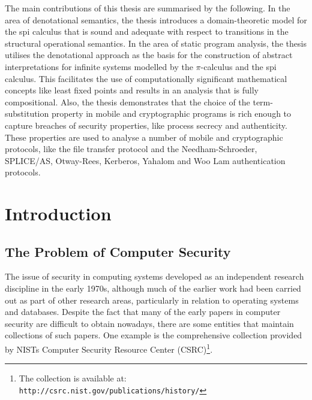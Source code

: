 \documentclass[10pt,a4paper,final,oneside,fleqn]{book}
\begin{document}
The main contributions of this thesis are summarised by the following. In the area of denotational semantics, the thesis introduces a domain-theoretic model for the spi calculus that is sound and adequate with respect to transitions in the structural operational semantics.  In the area of static program analysis, the thesis utilises the denotational approach as the basis for the construction of abstract interpretations for infinite systems modelled by the $\pi$-calculus and the spi calculus. This facilitates the use of computationally significant mathematical concepts like least fixed points and results in an analysis that is fully compositional.  Also, the thesis demonstrates that the choice of the term-substitution property in mobile and cryptographic programs is rich enough to capture breaches of security properties, like process secrecy and authenticity.  These properties are used to analyse a number of mobile and cryptographic protocols, like the file transfer protocol and the Needham-Schroeder, SPLICE/AS, Otway-Rees, Kerberos, Yahalom and Woo Lam authentication protocols.
\tableofcontents
\listoffigures
\chapter{Introduction}
\renewcommand{\thepage}{\arabic{page}}
\setcounter{page}{1}
\section{The Problem of Computer Security}
The issue of security in computing systems developed as an independent research discipline in the early 1970s, although much of the earlier work had been carried out as part of other research areas, particularly in relation to operating systems and databases.  Despite the fact that many of the early papers in computer security are difficult to obtain nowadays, there are some entities that maintain collections of such papers.  One example is the comprehensive collection provided by NISTs Computer Security Resource Center (CSRC)\footnote{The collection is available at: \texttt{http://csrc.nist.gov/publications/history/}}.
\end{document}
